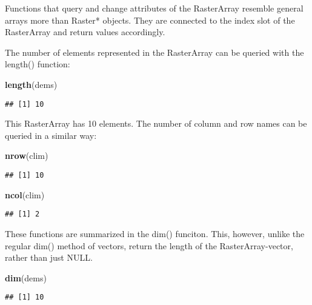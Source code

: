 \documentclass[]{article}
\newenvironment{Shaded}{\begin{snugshade}}{\end{snugshade}}
\newcommand{\KeywordTok}[1]{\textcolor[rgb]{0.13,0.29,0.53}{\textbf{#1}}}
\newcommand{\NormalTok}[1]{#1}
\begin{document}
Functions that query and change attributes of the RasterArray resemble
general arrays more than Raster* objects. They are connected to the
index slot of the RasterArray and return values accordingly.

The number of elements represented in the RasterArray can be queried
with the length() function:

\begin{Shaded}
\begin{Highlighting}[]
\KeywordTok{length}\NormalTok{(dems)}
\end{Highlighting}
\end{Shaded}

\begin{verbatim}
## [1] 10
\end{verbatim}

This RasterArray has 10 elements. The number of column and row names can
be queried in a similar way:

\begin{Shaded}
\begin{Highlighting}[]
\KeywordTok{nrow}\NormalTok{(clim)}
\end{Highlighting}
\end{Shaded}

\begin{verbatim}
## [1] 10
\end{verbatim}

\begin{Shaded}
\begin{Highlighting}[]
\KeywordTok{ncol}\NormalTok{(clim)}
\end{Highlighting}
\end{Shaded}

\begin{verbatim}
## [1] 2
\end{verbatim}

These functions are summarized in the dim() funciton. This, however,
unlike the regular dim() method of vectors, return the length of the
RasterArray-vector, rather than just NULL.

\begin{Shaded}
\begin{Highlighting}[]
\KeywordTok{dim}\NormalTok{(dems)}
\end{Highlighting}
\end{Shaded}

\begin{verbatim}
## [1] 10
\end{verbatim}
\end{document}
